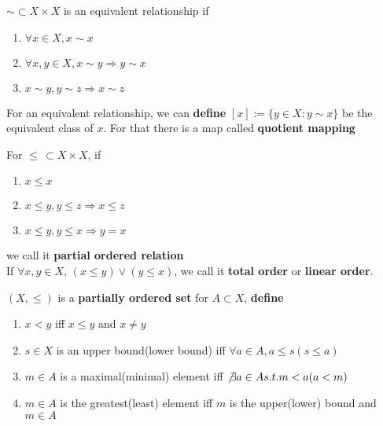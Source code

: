 \begin{definition}
     $ \sim \subset X\times X  $ is an equivalent relationship if
    \begin{enumerate}[(1)]
        \item  $ \forall x\in X,x\sim x $
        \item  $ \forall x,y\in X, x\sim y\Rightarrow y\sim x $
        \item  $ x\sim y,y\sim z \Rightarrow x\sim z $   
    \end{enumerate}
\end{definition}
For an equivalent relationship, we can \textbf{define}  $ [x]:=\{y\in X:y\sim x\} $ be the equivalent class of  $ x $. For that there is a map called \textbf{quotient mapping}\\
\begin{definition}
    For  $  \leqslant \,\subset X\times X $, if 
    \begin{enumerate}[(1)]
        \item  $ x \leqslant x $
        \item  $ x \leqslant y,y \leqslant z \Rightarrow x \leqslant z$
        \item  $ x \leqslant y,y \leqslant x\Rightarrow y=x $   
    \end{enumerate}  
    we call it \textbf{partial ordered relation}\\
    If  $ \forall x,y\in X ,\, (x \leqslant y)\lor (y \leqslant x) $, we call it \textbf{total order} or \textbf{linear order}. 
\end{definition} 
\begin{definition}
    $ (X, \leqslant) $ is a \textbf{partially ordered set}   
    for $ A\subset X $, \textbf{define}
    \begin{enumerate}
        \item  $ x<y $ iff  $ x \leqslant y $ and  $ x\not=y $  
        \item  $ s\in X  $ is an upper bound(lower bound) iff $ \forall a\in A, a \leqslant s (s \leqslant a)$
        \item  $ m\in A$ is a maximal(minimal) element iff  $ \not\exists a\in A s.t. m<a(a<m) $
        \item   $ m\in A  $ is the greatest(least) element iff  $ m $ is the upper(lower) bound and  $ m\in A $ 
    \end{enumerate}
\end{definition}